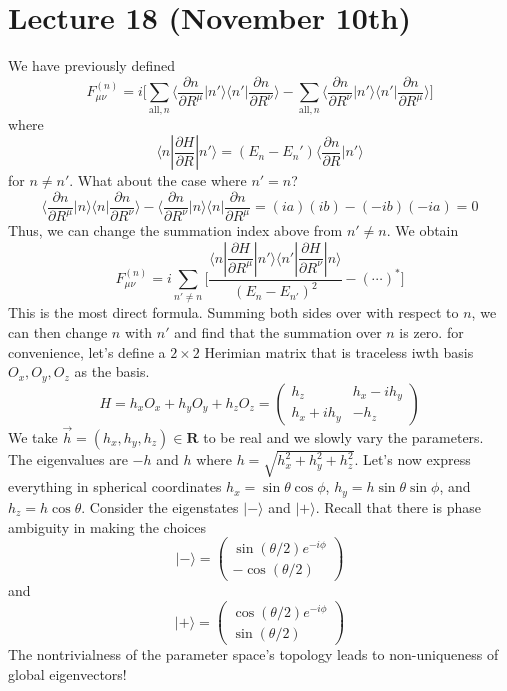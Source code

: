 \section{Lecture 18 (November 10th)}
\begin{defi}
We have previously defined
\[F^{(n)}_{\mu \nu }=i\Big[\sum _{\mathrm{all},n}\langle \dfrac{\partial n}{\partial R^{\mu }}|n' \rangle \langle n'|\dfrac{\partial n}{\partial R^{\nu }}\rangle  -\sum _{\mathrm{all},n}\langle \dfrac{\partial n}{\partial R^{\nu }}|n'\rangle \langle n'|\dfrac{\partial n}{\partial R^{\mu }} \rangle  \Big]\]
where
\[\langle n|\dfrac{\partial H}{\partial R}|n'\rangle =(E_{n}-E_{n}')\langle \dfrac{\partial n}{\partial R}|n'\rangle   \]
for $n\ne n'$. What about the case where $n'=n$?
\[\langle \dfrac{\partial n}{\partial R^{\mu }}|n\rangle \langle n|\dfrac{\partial n}{\partial R^{\nu }}\rangle -\langle \dfrac{\partial n}{\partial R^{\nu }}|n\rangle \langle n|\dfrac{\partial n}{\partial R^{\mu }}=(ia)(ib)-(-ib)(-ia)=0    \]
Thus, we can change the summation index above from $n'\ne n$. We obtain
\[F^{(n)}_{\mu \nu }=i\sum _{n'\ne n}\Big[\dfrac{\langle n|\dfrac{\partial H}{\partial R^{\mu }}|n'\rangle \langle n'|\dfrac{\partial H}{\partial R^{\nu }}|n\rangle   }{(E_{n}-E_{n'})^2}-(\cdots)^{*}\Big]\]
This is the most direct formula. Summing both sides over with respect to $n$, we can then change $n$ with $n'$ and find that the summation over $n$ is zero. for convenience, let's define a $2\times 2$ Herimian matrix that is traceless iwth basis $O_{x},O_{y},O_{z}$ as the basis. 
\[H=h_{x}O_{x}+h_{y}O_{y}+h_{z}O_{z}=\begin{pmatrix}
h_{z}&h_{x}-ih_{y}\\
h_{x}+ih_{y}&-h_{z}
\end{pmatrix}
\]
We take $\vec{h}=(h_{x},h_{y},h_{z})\in {\bm R}$ to be real and we slowly vary the parameters. The eigenvalues are $-h$ and $h$ where $h=\sqrt{h_{x}^2+h_{y}^2+h_{z}^2}$. Let's now express everything in spherical coordinates $h_{x}=\sin \theta \cos \phi $, $h_{y}=h \sin \theta \sin \phi $, and $h_{z}=h\cos \theta $. Consider the eigenstates $|-\rangle $ and $|+\rangle $. Recall that there is phase ambiguity in making the choices
\[|-\rangle =\begin{pmatrix}
\sin (\theta /2)e^{-i\phi }\\
-\cos (\theta /2)
\end{pmatrix}
\]
and
\[|+\rangle =\begin{pmatrix}
\cos (\theta /2)e^{-i\phi }\\
\sin (\theta /2)
\end{pmatrix}
\]
The nontrivialness of the parameter space's topology leads to non-uniqueness of global eigenvectors!
\end{defi}
